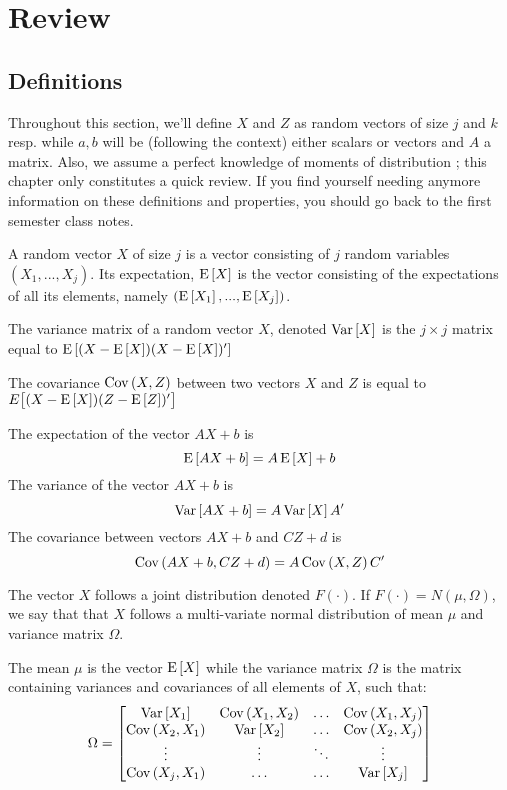 \section{Review}

\subsection{Definitions}

Throughout this section, we'll define $X$ and $Z$ as random vectors of size $j$ and $k$ resp. while $a,b$ will be (following the context) either scalars or vectors and $A$ a matrix. Also, we assume a perfect knowledge of moments of distribution ; this chapter only constitutes a quick review. If you find yourself needing anymore information on these definitions and properties, you should go back to the first semester class notes.

\begin{definition}
A random vector $X$ of size $j$ is a vector consisting of $j$ random variables $(X_1, ..., X_j)$. Its expectation, $\operatorname{E}\left[X\right]$ is the vector consisting of the expectations of all its elements, namely $(\operatorname{E}\left[X_1\right], ..., \operatorname{E}\left[X_j\right])$.
\end{definition}

\begin{definition}
The variance matrix of a random vector $X$, denoted $\operatorname{Var}\left[X\right]$ is the $j\times j$ matrix equal to $\operatorname{E}\left[(X - \operatorname{E}\left[X\right])(X - \operatorname{E}\left[X\right])'\right]$
\end{definition}
\begin{definition}
The covariance $\operatorname{Cov}\left(X,Z\right)$ between two vectors $X$ and $Z$ is equal to $E\big[ (X - \operatorname{E}\left[X\right])(Z - \operatorname{E}\left[Z\right])'\big]$
\end{definition}

\begin{proposition}
The expectation of the vector $AX + b$ is $$\operatorname{E}\left[AX + b\right] = A\operatorname{E}\left[X\right]+b $$
The variance of the vector $AX + b$ is $$\operatorname{Var}\left[A X + b\right] = A \operatorname{Var}\left[X\right]A'$$ The covariance between vectors $AX + b$ and $CZ + d$ is $$\operatorname{Cov}\left(A X + b,CZ + d\right) = A \operatorname{Cov}\left(X,Z\right) C'$$
\end{proposition}

\begin{definition}
The vector $X$ follows a joint distribution denoted $F(\cdot)$. If $F(\cdot) = N(\mu, \Omega)$, we say that that $X$ follows a multi-variate normal distribution of mean $\mu$ and variance matrix $\Omega$.

The mean $\mu$ is the vector $\operatorname{E}\left[X\right]$ while the variance matrix $\Omega$ is the matrix containing variances and covariances of all elements of $X$, such that: $$\Omega = \begin{bmatrix}
\operatorname{Var}\left[X_1\right] & \operatorname{Cov}\left(X_1, X_2\right) & \hdots & \operatorname{Cov}\left(X_1, X_j\right) \\
\operatorname{Cov}\left(X_2, X_1\right) & \operatorname{Var}\left[X_2\right] & \hdots & \operatorname{Cov}\left(X_2, X_j\right) \\
\vdots & \vdots & \ddots & \vdots \\
\operatorname{Cov}\left(X_j, X_1\right) & \hdots & \hdots & \operatorname{Var}\left[X_j\right]
\end{bmatrix} $$
\end{definition}


